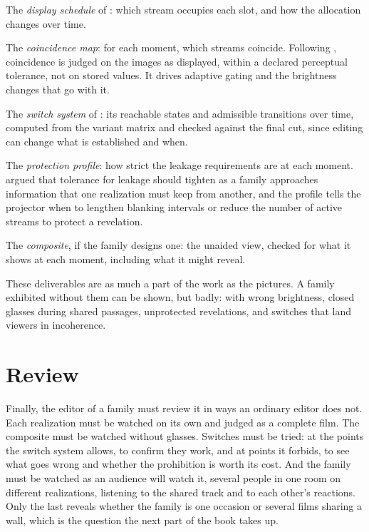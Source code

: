 The \emph{display schedule} of : which stream occupies each slot, and how the allocation changes over time.

The \emph{coincidence map}: for each moment, which streams coincide. Following , coincidence is judged on the images as displayed, within a declared perceptual tolerance, not on stored values. It drives adaptive gating and the brightness changes that go with it.

The \emph{switch system} of : its reachable states and admissible transitions over time, computed from the variant matrix and checked against the final cut, since editing can change what is established and when.

The \emph{protection profile}: how strict the leakage requirements are at each moment.  argued that tolerance for leakage should tighten as a family approaches information that one realization must keep from another, and the profile tells the projector when to lengthen blanking intervals or reduce the number of active streams to protect a revelation.

The \emph{composite}, if the family designs one: the unaided view, checked for what it shows at each moment, including what it might reveal.

These deliverables are as much a part of the work as the pictures. A family exhibited without them can be shown, but badly: with wrong brightness, closed glasses during shared passages, unprotected revelations, and switches that land viewers in incoherence.

\section{Review}

Finally, the editor of a family must review it in ways an ordinary editor does not. Each realization must be watched on its own and judged as a complete film. The composite must be watched without glasses. Switches must be tried: at the points the switch system allows, to confirm they work, and at points it forbids, to see what goes wrong and whether the prohibition is worth its cost. And the family must be watched as an audience will watch it, several people in one room on different realizations, listening to the shared track and to each other's reactions. Only the last reveals whether the family is one occasion or several films sharing a wall, which is the question the next part of the book takes up.
